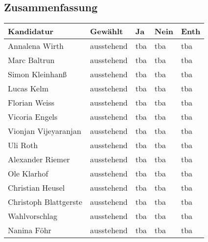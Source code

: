\subsection{Zusammenfassung}
\begin{center}
    \begin{tabular}{|p{6cm}|m{2cm}|m{1cm}|m{1cm}|m{1cm}|}
        \hline
        Kandidatur & Gewählt & Ja & Nein & Enth\\\hline
		Annalena Wirth & ausstehend & tba & tba & tba \\\hline
		Marc Baltrun & ausstehend & tba & tba & tba \\\hline
		Simon Kleinhanß & ausstehend & tba & tba & tba \\\hline
		Lucas Kelm & ausstehend & tba & tba & tba \\\hline
		Florian Weiss & ausstehend & tba & tba & tba \\\hline
		Vicoria Engels & ausstehend & tba & tba & tba \\\hline
		Vionjan Vijeyaranjan & ausstehend & tba & tba & tba \\\hline
		Uli Roth & ausstehend & tba & tba & tba \\\hline
		Alexander Riemer & ausstehend & tba & tba & tba \\\hline
		Ole Klarhof & ausstehend & tba & tba & tba \\\hline
		Christian Heusel & ausstehend & tba & tba & tba \\\hline
		Christoph Blattgerste & ausstehend & tba & tba & tba \\\hline
		Wahlvorschlag & ausstehend & tba & tba & tba \\\hline
		Nanina Föhr & ausstehend & tba & tba & tba \\\hline
    \end{tabular}
\end{center}